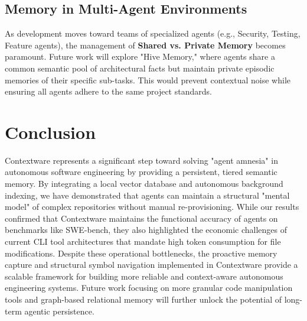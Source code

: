 \documentclass[conference]{IEEEtran}
\begin{document}
\subsection{Memory in Multi-Agent Environments}
As development moves toward teams of specialized agents (e.g., Security, Testing, Feature agents), the management of \textbf{Shared vs. Private Memory} becomes paramount. Future work will explore "Hive Memory," where agents share a common semantic pool of architectural facts but maintain private episodic memories of their specific sub-tasks. This would prevent contextual noise while ensuring all agents adhere to the same project standards.

\section{Conclusion}
Contextware represents a significant step toward solving "agent amnesia" in autonomous software engineering by providing a persistent, tiered semantic memory. By integrating a local vector database and autonomous background indexing, we have demonstrated that agents can maintain a structural "mental model" of complex repositories without manual re-provisioning. While our results confirmed that Contextware maintains the functional accuracy of agents on benchmarks like SWE-bench, they also highlighted the economic challenges of current CLI tool architectures that mandate high token consumption for file modifications. Despite these operational bottlenecks, the proactive memory capture and structural symbol navigation implemented in Contextware provide a scalable framework for building more reliable and context-aware autonomous engineering systems. Future work focusing on more granular code manipulation tools and graph-based relational memory will further unlock the potential of long-term agentic persistence.


\clearpage


\end{document}
